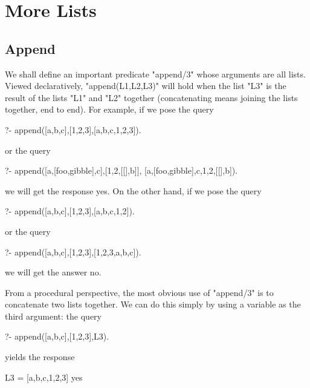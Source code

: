 

\chapter{More Lists}\label{CHAPTER6}


\section{Append}\label{SEC.L6.APPEND}



We shall define an important predicate "append/3" whose arguments are
all lists.  Viewed declaratively, "append(L1,L2,L3)" will
 hold when the list "L3" is
the result of  the lists "L1" and "L2"
together (concatenating means joining the lists together, end to end).
For example, if we pose the query
\begin{LPNcodedisplay}
?- append([a,b,c],[1,2,3],[a,b,c,1,2,3]).
\end{LPNcodedisplay}
or the query
\begin{LPNcodedisplay}
?- append([a,[foo,gibble],c],[1,2,[[],b]],
          [a,[foo,gibble],c,1,2,[[],b]).
\end{LPNcodedisplay}
we will get the response yes. On the other hand, if we pose
the query
\begin{LPNcodedisplay}
?- append([a,b,c],[1,2,3],[a,b,c,1,2]).
\end{LPNcodedisplay}
or the query
\begin{LPNcodedisplay}
?- append([a,b,c],[1,2,3],[1,2,3,a,b,c]).
\end{LPNcodedisplay}
we will get the answer no.


From a procedural perspective, the most obvious use of "append/3"
is to concatenate two lists together. We can do this simply by using a
variable as the third argument: the query
\begin{LPNcodedisplay}
?- append([a,b,c],[1,2,3],L3).
\end{LPNcodedisplay}
yields the response
\begin{LPNcodedisplay}
L3 = [a,b,c,1,2,3]
yes
\end{LPNcodedisplay}

